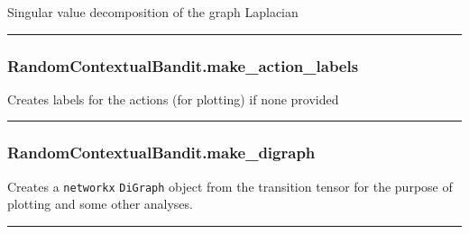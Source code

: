 \begin{Shaded}
\begin{Highlighting}[]
\NormalTok{)}
\end{Highlighting}
\end{Shaded}

Singular value decomposition of the graph Laplacian

\begin{center}\rule{0.5\linewidth}{\linethickness}\end{center}

\hypertarget{randomcontextualbandit.make_action_labels}{%
\subsubsection{RandomContextualBandit.make\_action\_labels}\label{randomcontextualbandit.make_action_labels}}

\begin{Shaded}
\begin{Highlighting}[]
\NormalTok{)}
\end{Highlighting}
\end{Shaded}

Creates labels for the actions (for plotting) if none provided

\begin{center}\rule{0.5\linewidth}{\linethickness}\end{center}

\hypertarget{randomcontextualbandit.make_digraph}{%
\subsubsection{RandomContextualBandit.make\_digraph}\label{randomcontextualbandit.make_digraph}}

\begin{Shaded}
\begin{Highlighting}[]
\NormalTok{)}
\end{Highlighting}
\end{Shaded}

Creates a \texttt{networkx} \texttt{DiGraph} object from the transition
tensor for the purpose of plotting and some other analyses.

\begin{center}\rule{0.5\linewidth}{\linethickness}\end{center}

